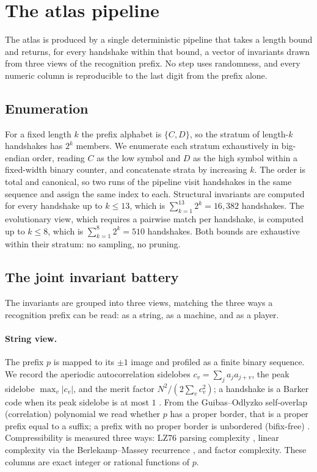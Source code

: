 \section{The atlas pipeline}\label{sec:method}

The atlas is produced by a single deterministic pipeline that takes a length bound
and returns, for every handshake within that bound, a vector of invariants drawn from
three views of the recognition prefix. No step uses randomness, and every numeric
column is reproducible to the last digit from the prefix alone.

\subsection{Enumeration}

For a fixed length $k$ the prefix alphabet is $\{C,D\}$, so the stratum of length-$k$
handshakes has $2^{k}$ members. We enumerate each stratum exhaustively in big-endian
order, reading $C$ as the low symbol and $D$ as the high symbol within a fixed-width
binary counter, and concatenate strata by increasing $k$. The order is total and
canonical, so two runs of the pipeline visit handshakes in the same sequence and assign
the same index to each. Structural invariants are computed for every handshake up to
$k\le 13$, which is $\sum_{k=1}^{13} 2^{k}=16{,}382$ handshakes. The evolutionary view,
which requires a pairwise match per handshake, is computed up to $k\le 8$, which is
$\sum_{k=1}^{8} 2^{k}=510$ handshakes. Both bounds are exhaustive within their stratum:
no sampling, no pruning.

\subsection{The joint invariant battery}

The invariants are grouped into three views, matching the three ways a recognition
prefix can be read: as a string, as a machine, and as a player.

\paragraph{String view.}
The prefix $p$ is mapped to its $\pm1$ image and profiled as a finite binary sequence.
We record the aperiodic autocorrelation sidelobes $c_v=\sum_j a_j a_{j+v}$, the peak
sidelobe $\max_v |c_v|$, and the merit factor $N^2/(2\sum_v c_v^2)$; a handshake is a
Barker code when its peak sidelobe is at most $1$ \citep{barker1953,turyn1961}. From the
Guibas--Odlyzko self-overlap (correlation) polynomial we read whether $p$ has a proper
border, that is a proper prefix equal to a suffix; a prefix with no proper border is
unbordered (bifix-free) \citep{guibas1981}. Compressibility is measured three ways:
LZ76 parsing complexity \citep{lempel1976}, linear complexity via the Berlekamp--Massey
recurrence \citep{massey1969}, and factor complexity. These columns are exact integer or
rational functions of $p$.

